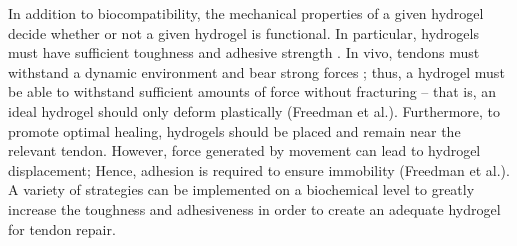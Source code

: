 In addition to biocompatibility, the mechanical properties of a given hydrogel decide whether or not a given hydrogel is functional. In particular, hydrogels must have sufficient toughness and adhesive strength \autocite{Freedman.EnhancedTendonHealing}. In vivo, tendons must withstand a dynamic environment and bear strong forces \autocite{Chen.AdvancesApplicationHydrogel}; thus, a hydrogel must be able to withstand sufficient amounts of force without fracturing – that is, an ideal hydrogel should only deform plastically (Freedman et al.). Furthermore, to promote optimal healing, hydrogels should be placed and remain near the relevant tendon. However, force generated by movement can lead to hydrogel displacement; Hence, adhesion is required to ensure immobility (Freedman et al.). A variety of strategies can be implemented on a biochemical level to greatly increase the toughness and adhesiveness in order to create an adequate hydrogel for tendon repair.
